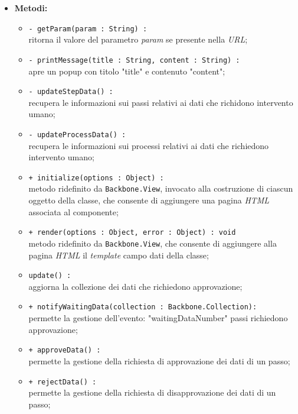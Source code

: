 \begin{flushleft}
\begin{itemize}
\begin{sloppypar}
\begin{itemize}
\end{itemize}
\end{sloppypar}
\item \textbf{Metodi:}
\begin{sloppypar}
\begin{itemize}
\item \texttt{- getParam(param : String) :}\\ ritorna il valore del parametro \textit{param} se presente nella \textit{URL};
  \item \texttt{- printMessage(title : String, content : String) :}\\ apre un popup con titolo "title" e contenuto "content";
  \item \texttt{- updateStepData() :}\\ recupera le informazioni sui passi relativi ai dati che richidono intervento umano;
  \item \texttt{- updateProcessData() :}\\ recupera le informazioni sui processi relativi ai dati che richiedono intervento umano;
\item \texttt{+ initialize(options : Object) :}\\ metodo ridefinito da \texttt{Backbone.View}, invocato alla costruzione di ciascun oggetto della classe, che consente di aggiungere una pagina \textit{HTML} associata al componente;
\item \texttt{+ render(options : Object, error : Object) : void}\\ metodo ridefinito da \texttt{Backbone.View}, che consente di aggiungere alla pagina \textit{HTML} il \textit{template} campo dati della classe;
\item \texttt{update() :}\\ aggiorna la collezione dei dati che richiedono approvazione;
    \item \texttt{+ notifyWaitingData(collection : Backbone.Collection):}\\ permette la gestione dell'evento: "waitingDataNumber" passi richiedono approvazione;
    \item \texttt{+ approveData() :}\\ permette la gestione della richiesta di approvazione dei dati di un passo;
    \item \texttt{+ rejectData() :}\\ permette la gestione della richiesta di disapprovazione dei dati di un passo;
\end{itemize}
\end{sloppypar}
\end{itemize}
\end{flushleft}

